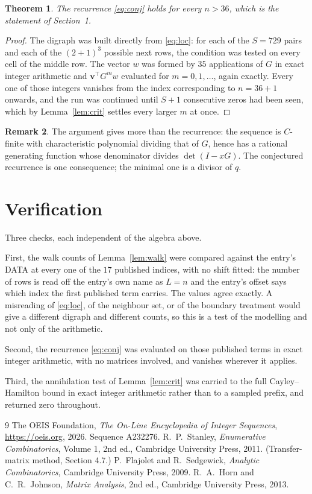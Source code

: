 \documentclass[11pt,a4paper]{article}
\theoremstyle{plain}
\newtheorem{theorem}{Theorem}
\theoremstyle{definition}
\newtheorem{remark}[theorem]{Remark}
\begin{document}
\begin{theorem}
The recurrence \eqref{eq:conj} holds for every $n>36$, which is the statement of
Section~1.
\end{theorem}

\begin{proof}
The digraph was built directly from \eqref{eq:loc}: for each of the $S=729$ pairs and each
of the $(2+1)^{3}$ possible next rows, the condition was tested on every cell of
the middle row. The vector $w$ was formed by $35$ applications of $G$ in exact integer
arithmetic and $\mathbf{v}^{\!\top}G^{m}w$ evaluated for $m=0,1,\dots$, again exactly.
Every one of those integers vanishes from the index corresponding to $n=36+1$ onwards,
and the run was continued until $S+1$ consecutive zeros had been seen, which by
Lemma~\ref{lem:crit} settles every larger $m$ at once.
\end{proof}

\begin{remark}
The argument gives more than the recurrence: the sequence is $C$-finite with characteristic
polynomial dividing that of $G$, hence has a rational generating function whose denominator
divides $\det(I-xG)$. The conjectured recurrence is one consequence; the minimal one is a
divisor of $q$.
\end{remark}

\section{Verification}

Three checks, each independent of the algebra above.

First, the walk counts of Lemma~\ref{lem:walk} were compared against the entry's DATA at
every one of the $17$ published indices, with no shift fitted: the number of rows is
read off the entry's own name as $L=n$ and the entry's offset says which index the first
published term carries. The values agree exactly. A misreading of \eqref{eq:loc}, of the
neighbour set, or of the boundary treatment would give a different digraph and different
counts, so this is a test of the modelling and not only of the arithmetic.

Second, the recurrence \eqref{eq:conj} was evaluated on those published terms in exact
integer arithmetic, with no matrices involved, and vanishes wherever it applies.

Third, the annihilation test of Lemma~\ref{lem:crit} was carried to the full
Cayley--Hamilton bound in exact integer arithmetic rather than to a sampled prefix, and
returned zero throughout.

\begin{thebibliography}{9}
 The OEIS Foundation, \emph{The On-Line Encyclopedia of Integer
Sequences}, \url{https://oeis.org}, 2026. Sequence A232276.
 R.~P.~Stanley, \emph{Enumerative Combinatorics}, Volume 1, 2nd ed.,
Cambridge University Press, 2011. (Transfer-matrix method, Section 4.7.)
 P.~Flajolet and R.~Sedgewick, \emph{Analytic Combinatorics}, Cambridge
University Press, 2009.
 R.~A.~Horn and C.~R.~Johnson, \emph{Matrix Analysis}, 2nd ed., Cambridge
University Press, 2013.
\end{thebibliography}
\end{document}
